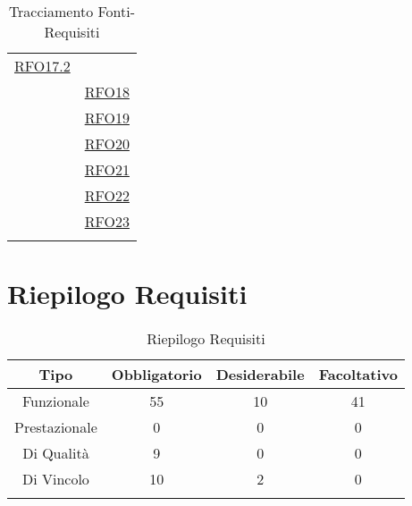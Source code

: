 \begin{longtable}{|>{\centering}m{5cm}|m{5cm}<{\centering}|}
	\hyperlink{RFO17.2}{RFO17.2}\\ & \hyperlink{RFO18}{RFO18}\\ & \hyperlink{RFO19}{RFO19}\\ & \hyperlink{RFO20}{RFO20}\\ & \hyperlink{RFO21}{RFO21}\\ & \hyperlink{RFO22}{RFO22}\\ & \hyperlink{RFO23}{RFO23}\\ \hline
	\caption[Tracciamento Fonti-Requisiti]{Tracciamento Fonti-Requisiti}
	\label{tabella:fonti-requi}
\end{longtable}
\clearpage

\section{Riepilogo Requisiti}
\normalsize
\begin{longtable}{|c|c|c|c|}
	\hline 
	\textbf{Tipo} & \textbf{Obbligatorio} & \textbf{Desiderabile} & \textbf{Facoltativo}\\
	\hline
	Funzionale & 55 & 10 & 41\\ \hline
	Prestazionale & 0 & 0 & 0\\ \hline
	Di Qualità & 9 & 0 & 0\\ \hline
	Di Vincolo & 10 & 2 & 0\\ \hline
	\caption[Riepilogo Requisiti]{Riepilogo Requisiti}
	\label{tabella:riepilogorequi}
\end{longtable}
\clearpage


